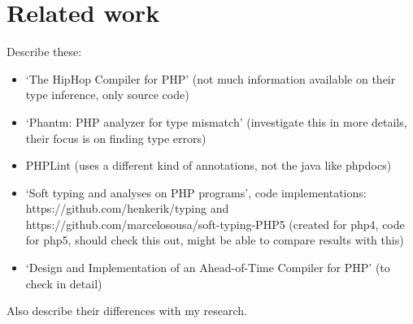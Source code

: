 \documentclass[../main.tex]{subfiles}
\begin{document}
    
    \section{Related work}
    Describe these:
    \begin{itemize}
        \item `The HipHop Compiler for PHP'\cite{Zhao:12} (not much information available on their type inference, only source code)
        \item `Phantm: PHP analyzer for type mismatch'\cite{Kne:10,Bar:10} (investigate this in more details, their focus is on finding type errors)
        \item PHPLint \footnotemark (uses a different kind of annotations, not the java like phpdocs)
        \item `Soft typing and analyses on PHP programs'\cite{}, code implementations: https://github.com/henkerik/typing and https://github.com/marcelosousa/soft-typing-PHP5 (created for php4, code for php5, should check this out, might be able to compare results with this)
        \item `Design and Implementation of an Ahead-of-Time Compiler for PHP'\cite{Big:10} (to check in detail)
    \end{itemize}
    Also describe their differences with my research.
    
\end{document}

